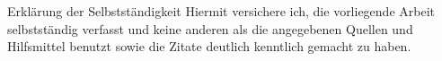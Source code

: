 











 
 
 



\newpage
\LARGE{Erkl{\"a}rung der Selbstst{\"a}ndigkeit}
\vspace{2em}
\large{Hiermit versichere ich, die vorliegende Arbeit selbstst{\"a}ndig verfasst und keine anderen als die angegebenen Quellen und Hilfsmittel benutzt sowie die Zitate deutlich kenntlich gemacht zu haben.}

\twocolumn